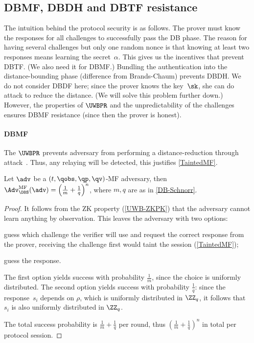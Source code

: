 \subsection{\acs*{DBMF}, \acs*{DBDH} and \acs*{DBTF} resistance}

The intuition behind the protocol security is as follows.
The prover must know the responses for all challenges to successfully pass the 
\ac{DB} phase.
The reason for having several challenges but only one random nonce is that 
knowing at least two responses means learning the secret~\(\alpha\).
This gives us the incentives that prevent \ac{DBTF}.
(We also need it for \ac{DBMF}.)
Bundling the authentication into the distance-bounding phase (difference from 
Brands-Chaum) prevents \ac{DBDH}.
We do not consider \ac{DBDF} here; since the prover knows the key~\(\sk\), she 
can do  attack to reduce the distance.
(We will solve this problem further down.)
However, the properties of \(\UWBPR\) and the unpredictability of the 
challenges ensures \ac{DBMF} resistance (since then the prover is honest).

\paragraph{\Acl{DBMF}}

The \(\UWBPR\) prevents  adversary from performing a 
distance-reduction through  attack~\cite{UWBPR}.
Thus, any relaying will be detected, \ie this justifies \cref{TaintedMF}.

\begin{theorem}
  Let \(\adv\) be a \((t, \qobs, \qp, \qv)\)-MF adversary, then 
  \(\Adv_{\DBS}^{\text{MF}}(\adv) = \left(\frac{1}{m}+\frac{1}{q}\right)^n\), 
  where \(m, q\) are as in \cref{DB-Schnorr}.
\end{theorem}

\begin{proof}
  It follows from the \ac{ZK} property (\cref{UWB-ZKPK}) that the adversary 
  cannot learn anything by observation.
  This leaves the adversary with two options:
  \begin{enumerate*}
  \item guess which challenge the verifier will use and request the correct 
    response from the prover, receiving the challenge first would taint the 
    session (\cref{TaintedMF});
  \item guess the response.
  \end{enumerate*}
  The first option yields success with probability \(\frac{1}{m}\), since the 
  choice is uniformly distributed.
  The second option yields success with probability \(\frac{1}{q}\): since the 
  response~\(s_i\) depends on \(\rho\), which is uniformly distributed in 
  \(\ZZ_q\), it follows that \(s_i\) is also uniformly distributed in 
  \(\ZZ_q\).

  The total success probability is \(\frac{1}{m} + \frac{1}{q}\) per round, 
  thus \(\left(\frac{1}{m}+\frac{1}{q}\right)^n\) in total per protocol 
  session.
\end{proof}

